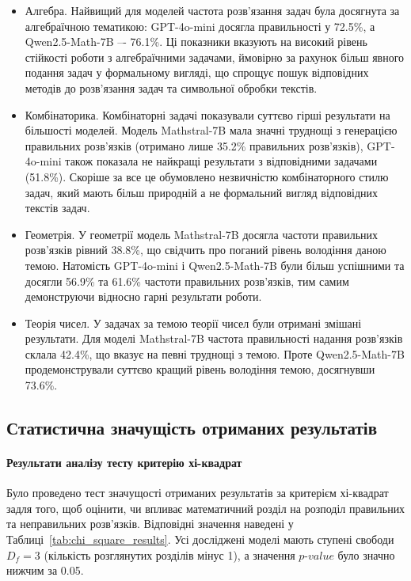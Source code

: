 \begin{itemize}
    \item {Алгебра}. Найвищий для моделей частота розв'язання задач була досягнута за алгебраїчною тематикою: GPT-4o-mini досягла правильності у 72.5\%, а Qwen2.5-Math-7B –- 76.1\%. Ці показники вказують на високий рівень стійкості роботи з алгебраїчними задачами, ймовірно за рахунок більш явного подання задач у формальному вигляді, що спрощує пошук відповідних методів до розв'язання задач та символьної обробки текстів.
    
    \item {Комбінаторика}. Комбінаторні задачі показували суттєво гірші результати на більшості моделей. Модель Mathstral-7B мала значні труднощі з генерацією правильних розв'язків (отримано лише 35.2\% правильних розв'язків), GPT-4o-mini також показала не найкращі результати з відповідними задачами (51.8\%). Скоріше за все це обумовлено незвичністю комбінаторного стилю задач, який мають більш природній а не формальний вигляд відповідних текстів задач.
    
    \item {Геометрія}. У геометрії модель Mathstral-7B досягла частоти правильних розв'язків рівний 38.8\%, що свідчить про поганий рівень володіння даною темою. Натомість GPT-4o-mini і Qwen2.5-Math-7B були більш успішними та досягли 56.9\% та 61.6\% частоти правильних розв'язків, тим самим демонструючи відносно гарні результати роботи.
    
    \item {Теорія чисел}. У задачах за темою теорії чисел були отримані змішані результати. Для моделі Mathstral-7B частота правильності надання розв'язків склала 42.4\%, що вказує на певні труднощі з темою. Проте Qwen2.5-Math-7B продемонстрували суттєво кращий рівень володіння темою, досягнувши 73.6\%.
\end{itemize}

\subsection{Статистична значущість отриманих результатів}
\label{sec:ampd-stats}

\paragraph{Результати аналізу тесту критерію хі-квадрат}
Було проведено тест значущості отриманих результатів за критерієм хі-квадрат задля того, щоб оцінити, чи впливає математичний розділ на розподіл правильних та неправильних розв'язків. Відповідні значення наведені у Таблиці~\ref{tab:chi_square_results}. Усі досліджені моделі мають ступені свободи $D_{f} = 3$ (кількість розглянутих розділів мінус 1), а значення $p\text{-}value$ було значно нижчим за 0.05.

